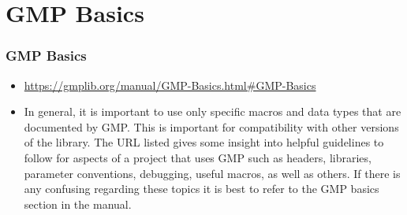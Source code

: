 
\section{GMP Basics}

\begin{frame}
\frametitle{GMP Basics}
\begin{itemize}
\item \url{https://gmplib.org/manual/GMP-Basics.html\#GMP-Basics}
\item In general, it is important to use only specific
  macros and data types that are documented by GMP. This is
  important for compatibility with other versions of the
  library. The URL listed gives some insight into helpful
  guidelines to follow for aspects of a project that uses
  GMP such as headers, libraries, parameter conventions,
  debugging, useful macros, as well as others. If there is
  any confusing regarding these topics it is best to refer
  to the GMP basics section in the manual.
\end{itemize}
\end{frame}
